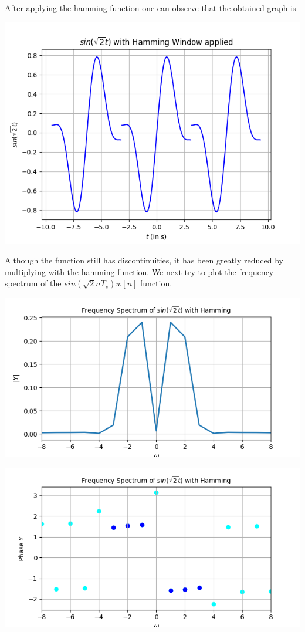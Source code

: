 \documentclass[12pt, a4paper]{report}
\begin{document}
After applying the hamming function one can observe that the obtained graph is
\begin{center}
	\includegraphics[scale=0.75]{Figure_5.png} 
	\label{fig:rawdata}
\end{center}
Although the function still has discontinuities, it has been greatly reduced by multiplying with the hamming function. We next try to plot the frequency spectrum of the $sin(\sqrt{2}nT_s)w[n]$ function.
\clearpage

\begin{center}
	\includegraphics[scale=0.75]{Figure_6.png} 
	\label{fig:rawdata}
\end{center}
\begin{center}
	\includegraphics[scale=0.75]{Figure_7.png} 
	\label{fig:rawdata}
\end{center}
\end{document}
